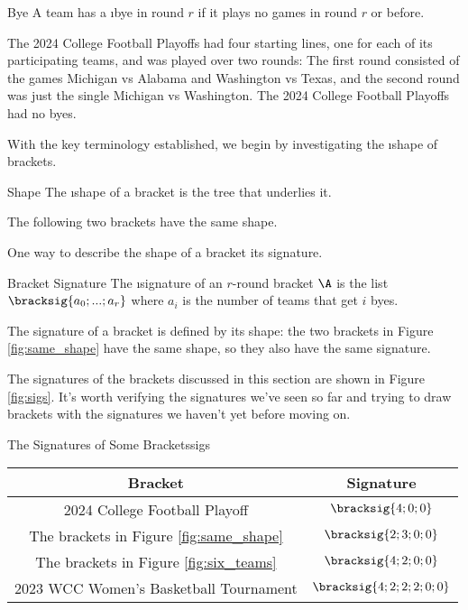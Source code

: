 {\begin{definition}{Bye}{}
    A team has a \i{bye} in round $r$ if it plays no games in round $r$ or before.
\end{definition}

The 2024 College Football Playoffs had four starting lines, one for each of its participating teams, and was played over two rounds: The first round consisted of the games Michigan vs Alabama and Washington vs Texas, and the second round was just the single  Michigan vs Washington. The 2024 College Football Playoffs had no byes.

With the key terminology established, we begin by investigating the \i{shape} of brackets.

\begin{definition}{Shape}{}
    The \i{shape} of a bracket is the tree that underlies it.
\end{definition}

The following two brackets have the same shape.


One way to describe the shape of a bracket its signature.

\begin{definition}{Bracket Signature}{}
    The \i{signature} of an $r$-round bracket $\A$ is the list $\bracksig{a_0; ...; a_r}$ where $a_i$ is the number of teams that get $i$ byes.
\end{definition}

The signature of a bracket is defined by its shape: the two brackets in Figure \ref{fig:same_shape} have the same shape, so they also have the same signature.

The signatures of the brackets discussed in this section are shown in Figure \ref{fig:sigs}. It's worth verifying the signatures we've seen so far and trying to draw brackets with the signatures we haven't yet before moving on.

\begin{figg}{The Signatures of Some Brackets}{sigs}
    \begin{center}
        \begin{tabular}{ c | c }
            Bracket & Signature \\
            \hline
            2024 College Football Playoff & $\bracksig{4; 0; 0}$ \\
            The brackets in Figure \ref{fig:same_shape} & $\bracksig{2; 3; 0; 0}$\\
            The brackets in Figure \ref{fig:six_teams} & $\bracksig{4; 2; 0; 0}$\\
            2023 WCC Women's Basketball Tournament & $\bracksig{4;2;2;2;0;0}$ \\
        \end{tabular}
    \end{center}
\end{figg}

}
